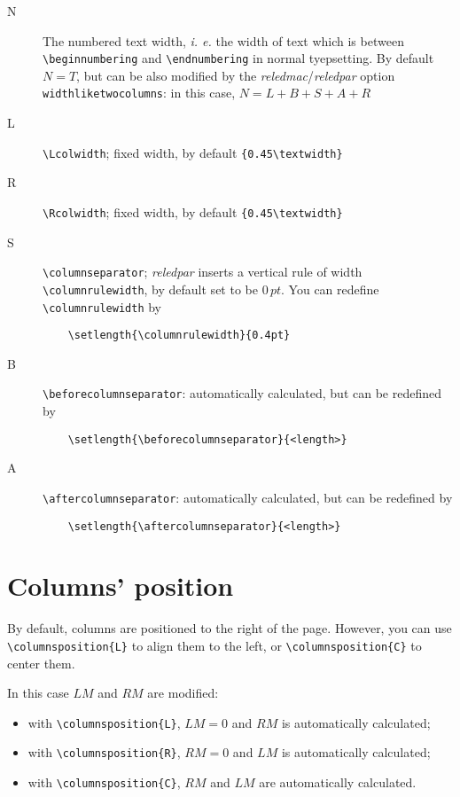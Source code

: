 \documentclass[11pt,a4paper]{article}
\newcommand{\package}[1]{\emph{#1}}
\begin{document}
\begin{description}
	\item[N] The numbered text width, \emph{i. e.} the width of text which is between \verb+\beginnumbering+ and \verb+\endnumbering+ in normal tyepsetting. By default $N=T$, but can be also modified by the \package{reledmac}/\package{reledpar} option \verb!widthliketwocolumns!: in this case, $N=L+B+S+A+R$

	\item[L] \verb!\Lcolwidth!; fixed width, by default \verb!{0.45\textwidth}!

	\item[R] \verb!\Rcolwidth!; fixed width, by default \verb!{0.45\textwidth}!

	\item[S] \verb!\columnseparator!; \package{reledpar} inserts a vertical rule of width \verb!\columnrulewidth!, by default set to be $0\,pt$. You can redefine \verb!\columnrulewidth! by

\begin{verbatim}
	\setlength{\columnrulewidth}{0.4pt}
\end{verbatim}

	\item[B] \verb!\beforecolumnseparator!: automatically calculated, but can be redefined by

\begin{verbatim}
	\setlength{\beforecolumnseparator}{<length>}
\end{verbatim}

	\item[A] \verb!\aftercolumnseparator!: automatically calculated, but can be redefined by

\begin{verbatim}
	\setlength{\aftercolumnseparator}{<length>}
\end{verbatim}

\end{description}

\section{Columns' position}
By default, columns are positioned to the right of the page. However, you can use
\verb!\columnsposition{L}! to align them to the left, or \verb!\columnsposition{C}! to center
them.

In this case $LM$ and $RM$ are modified:

\begin{itemize}
	\item with \verb!\columnsposition{L}!, $LM=0$ and $RM$ is automatically calculated;
	\item with \verb!\columnsposition{R}!, $RM=0$ and $LM$ is automatically calculated;
	\item with \verb!\columnsposition{C}!, $RM$ and $LM$ are automatically calculated.
\end{itemize}
\end{document}
